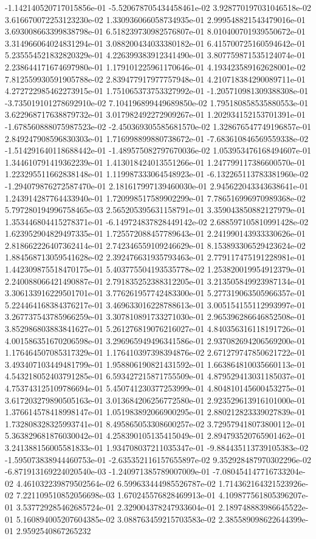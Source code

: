 -1.142140520717015856e-01	-5.520678705434458461e-02	3.928770197031046518e-02	3.616670072253123230e-02	1.330936066058734935e-01	2.999548821543479016e-01	3.693008663399838798e-01	6.518239730982576807e-01	8.010400701939550672e-01	3.314966064024831294e-01	3.088200434033380182e-01	6.415700725160594642e-01	5.235554521832820329e-01	4.226399383912341490e-01	3.807759871535124074e-01	2.238644171674697980e-01	1.179101225961170646e-01	4.193423589162628001e-02	7.812559930591905788e-02	2.839477917977757948e-01	4.210718384290089711e-01	4.272722985462273915e-01	1.751065373753327992e-01	-1.205710981309388308e-01	-3.735019101278692910e-02	7.104196899449689850e-02	1.795180858535880553e-01	3.622968717638879732e-01	3.017982492272909267e-01	1.202934152153701391e-01	-1.678560888075987523e-02	-2.450369305585681570e-02	1.328676547749196857e-01	2.849247908596830303e-01	1.716998899880738672e-01	-7.683610846569559338e-02	-1.514291640118688442e-01	-1.489575082797670036e-02	1.053953476168494607e-01	1.344610791419362239e-01	1.413018424013551266e-01	1.247799117386600570e-01	1.223295511662838148e-01	1.119987333064548923e-01	-6.132265113783381960e-02	-1.294079876272587470e-01	2.181617997139460030e-01	2.945622043343638641e-01	1.243914287764433940e-01	1.720998517589902299e-01	7.786516996970989368e-02	5.797280194996758465e-03	2.565205395631158791e-01	3.359043850882127979e-01	1.353446804415278371e-01	-6.149724837828449142e-02	2.688597105810991428e-02	1.623952904829497335e-01	1.725572088457789643e-01	2.241990143933330626e-01	2.818662226407362414e-01	2.742346559109246629e-01	8.153893306529423624e-02	1.884568713059541628e-02	2.392476631935793463e-01	2.779117475191228981e-01	1.442309875518470175e-01	5.403775504193535778e-02	1.253820019954912379e-01	2.240088066421490887e-01	2.791835252388312205e-01	3.213505849923987134e-01	3.306133916229501701e-01	3.776261957742483300e-01	5.277319063505966357e-01	5.224464168384376217e-01	3.469633016228788613e-01	3.005154155112993997e-01	3.267737543785966259e-01	3.307810891733271030e-01	2.965396286646852508e-01	3.852986803883841627e-01	5.261276819076216027e-01	4.840356316118191726e-01	4.001586351670206598e-01	3.296965949496341586e-01	2.937082694206569200e-01	1.176464507085317329e-01	1.176410397398394876e-02	2.671279747850621722e-01	3.493407103449481799e-01	1.958806190821431592e-01	1.663864810035660113e-01	4.543218052403791285e-01	6.593427215871755509e-01	4.879529413031185037e-01	4.753743125109786694e-01	5.450741230377253999e-01	4.804810145600453275e-01	3.617203279890505163e-01	3.013684206256772580e-01	2.923529613916101000e-01	1.376614578418998147e-01	1.051983892066900295e-01	2.880212823339027839e-01	1.732808328325993741e-01	8.495865053308600257e-02	3.729579418073800112e-01	5.363829681876030042e-01	4.258390105135415049e-01	2.894793520765901462e-01	3.241388156005581833e-01	1.934708037211035347e-01	-9.884435113739105383e-02	-1.595073838944460753e-01	-2.635352116157655897e-02	9.352928487970302296e-02	-6.871913169224020540e-03	-1.240971385789007009e-01	-7.080454147716733204e-02	4.461032239879502564e-02	6.599633444985526787e-02	1.714362164321523926e-02	7.221109510852056698e-03	1.670245576828469913e-01	4.109877561805396207e-01	3.537729285462685724e-01	2.329004378247933604e-01	2.189748883986645522e-01	5.160894005207604385e-02	3.088763459215703583e-02	2.385589098622644399e-01	2.9592540867265232